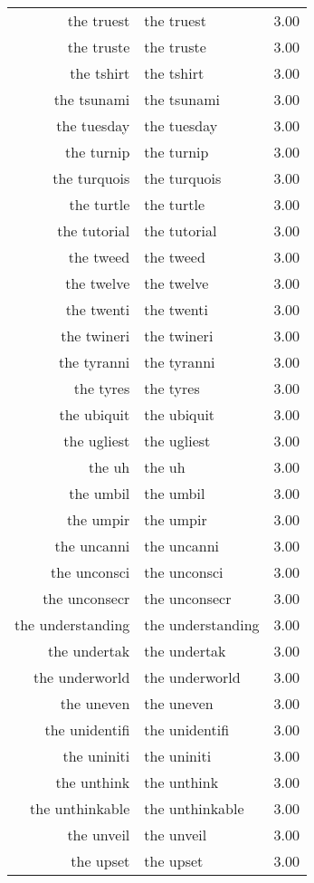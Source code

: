 \begin{table}[ht]
\begin{tabular}{rlr}
  the truest & the truest & 3.00 \\ 
  the truste & the truste & 3.00 \\ 
  the tshirt & the tshirt & 3.00 \\ 
  the tsunami & the tsunami & 3.00 \\ 
  the tuesday & the tuesday & 3.00 \\ 
  the turnip & the turnip & 3.00 \\ 
  the turquois & the turquois & 3.00 \\ 
  the turtle & the turtle & 3.00 \\ 
  the tutorial & the tutorial & 3.00 \\ 
  the tweed & the tweed & 3.00 \\ 
  the twelve & the twelve & 3.00 \\ 
  the twenti & the twenti & 3.00 \\ 
  the twineri & the twineri & 3.00 \\ 
  the tyranni & the tyranni & 3.00 \\ 
  the tyres & the tyres & 3.00 \\ 
  the ubiquit & the ubiquit & 3.00 \\ 
  the ugliest & the ugliest & 3.00 \\ 
  the uh & the uh & 3.00 \\ 
  the umbil & the umbil & 3.00 \\ 
  the umpir & the umpir & 3.00 \\ 
  the uncanni & the uncanni & 3.00 \\ 
  the unconsci & the unconsci & 3.00 \\ 
  the unconsecr & the unconsecr & 3.00 \\ 
  the understanding & the understanding & 3.00 \\ 
  the undertak & the undertak & 3.00 \\ 
  the underworld & the underworld & 3.00 \\ 
  the uneven & the uneven & 3.00 \\ 
  the unidentifi & the unidentifi & 3.00 \\ 
  the uniniti & the uniniti & 3.00 \\ 
  the unthink & the unthink & 3.00 \\ 
  the unthinkable & the unthinkable & 3.00 \\ 
  the unveil & the unveil & 3.00 \\ 
  the upset & the upset & 3.00 \\ 

\end{tabular}
\end{table}
